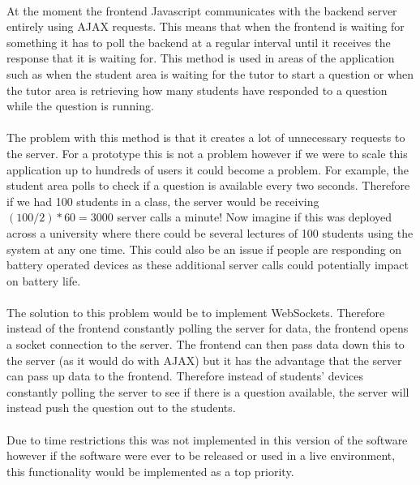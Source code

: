 \documentclass[10pt]{report}
\begin{document}
    \paragraph{}
    At the moment the frontend Javascript communicates with the backend server entirely using AJAX
    requests.  This means that when the frontend is waiting for something it has to poll the backend at a
    regular interval until it receives the response that it is waiting for. This method is used in areas
    of the application such as when the student area is waiting for the tutor to start a question or when
    the tutor area is retrieving how many students have responded to a question while the question is
    running.
    
    \paragraph{}
    The problem with this method is that it creates a lot of unnecessary requests to the server.  For a
    prototype this is not a problem however if we were to scale this application up to hundreds of users
    it could become a problem.  For example, the student area polls to check if a question is available
    every two seconds.  Therefore if we had 100 students in a class, the server would be receiving
    $(100/2)*60=3000$ server calls a minute!  Now imagine if this was deployed across a university where
    there could be several lectures of 100 students using the system at any one time.  This could also be
    an issue if people are responding on battery operated devices as these additional server calls could
    potentially impact on battery life.
    
    \paragraph{}
    The solution to this problem would be to implement WebSockets.  Therefore instead of the frontend
    constantly polling the server for data, the frontend opens a socket connection to the server.  The
    frontend can then pass data down this to the server (as it would do with AJAX) but it has the
    advantage that the server can pass up data to the frontend.  Therefore instead of students' devices 
    constantly polling the server to see if there is a question available, the server will instead push
    the question out to the students.
    
    \paragraph{}
    Due to time restrictions this was not implemented in this version of the software however if the
    software were ever to be released or used in a live environment, this functionality would be
    implemented as a top priority.
\end{document}
